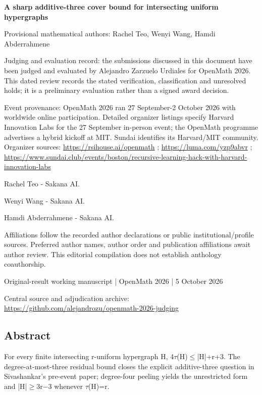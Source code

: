 \documentclass[11pt,a4paper]{article}
\begin{document}
{\LARGE\bfseries A sharp additive-three cover bound for intersecting uniform hypergraphs\par}\medskip
{\small Provisional mathematical authors: Rachel Teo, Wenyi Wang, Hamdi Abderrahmene\par}\medskip
{\small Judging and evaluation record: the submissions discussed in this document have been judged and evaluated by Alejandro Zarzuelo Urdiales for OpenMath 2026. This dated review records the stated verification, classification and unresolved holds; it is a preliminary evaluation rather than a signed award decision.\par}

{\small Event provenance: OpenMath 2026 ran 27 September-2 October 2026 with worldwide online participation. Detailed organizer listings specify Harvard Innovation Labs for the 27 September in-person event; the OpenMath programme advertises a hybrid kickoff at MIT. Sundai identifies its Harvard/MIT community. Organizer sources: \url{https://rsihouse.ai/openmath} ; \url{https://luma.com/yzp9abvr} ; \url{https://www.sundai.club/events/boston/recursive-learning-hack-with-harvard-innovation-labs}\par}

{\small Rachel Teo  -  Sakana AI.\par}

{\small Wenyi Wang  -  Sakana AI.\par}

{\small Hamdi Abderrahmene  -  Sakana AI.\par}

{\small Affiliations follow the recorded author declarations or public institutional/profile sources. Preferred author names, author order and publication affiliations await author review. This editorial compilation does not establish anthology coauthorship.\par}

{\small Original-result working manuscript | OpenMath 2026 | 5 October 2026\par}\medskip
{\small Central source and adjudication archive: \url{https://github.com/alejandrozu/openmath-2026-judging}\par}

\subsection{Abstract}
For every finite intersecting r-uniform hypergraph H, 4\ensuremath{\tau}(H)\ensuremath{\leq}|H|+r+3. The degree-at-most-three residual bound closes the explicit additive-three question in Sivashankar's pre-event paper; degree-four peeling yields the unrestricted form and |H|\ensuremath{\geq}3r\ensuremath{-}3 whenever \ensuremath{\tau}(H)=r.
\end{document}
